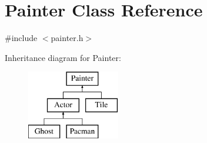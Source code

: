 \hypertarget{class_painter}{}\section{Painter Class Reference}
\label{class_painter}


{\ttfamily \#include $<$painter.\+h$>$}

Inheritance diagram for Painter\+:\begin{figure}[H]
\begin{center}
\leavevmode
\includegraphics[height=3.000000cm]{class_painter}
\end{center}
\end{figure}
